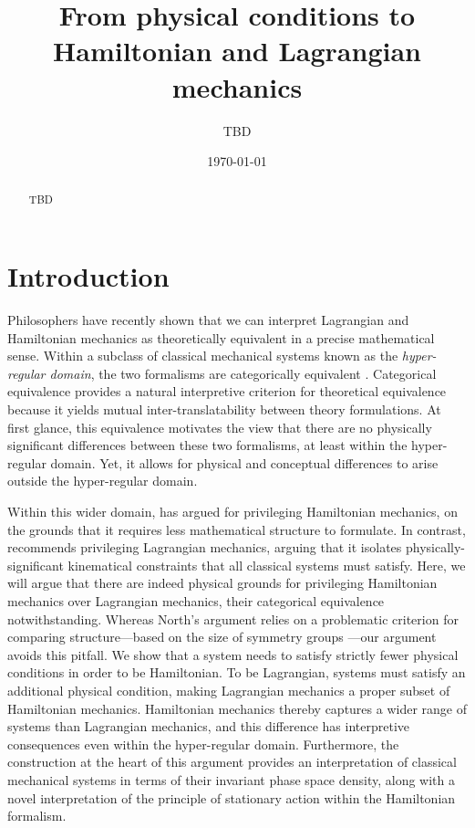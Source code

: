 \documentclass[letterpaper]{article}
\begin{document}
\title{From physical conditions to Hamiltonian and Lagrangian mechanics}
\author{TBD}

\date{\today}

\maketitle

\begin{abstract}
	TBD
\end{abstract}

\tableofcontents 


\section{Introduction}
\label{introduction}



Philosophers have recently shown that we can interpret Lagrangian and Hamiltonian mechanics as theoretically equivalent in a precise mathematical sense. Within a subclass of classical mechanical systems known as the \textit{hyper-regular domain}, the two formalisms are categorically equivalent \parencites[]{Teh}{Barrett2}. Categorical equivalence provides a natural interpretive criterion for theoretical equivalence because it yields mutual inter-translatability between theory formulations. At first glance, this equivalence motivates the view that there are no physically significant differences between these two formalisms, at least within the hyper-regular domain. Yet, it allows for physical and conceptual differences to arise outside the hyper-regular domain. 

Within this wider domain, \textcites[]{North} has argued for privileging Hamiltonian mechanics, on the grounds that it requires less mathematical structure to formulate. In contrast, \textcites[]{Curiel} recommends privileging Lagrangian mechanics, arguing that it isolates physically-significant kinematical constraints that all classical systems must satisfy. Here, we will argue that there are indeed physical grounds for privileging Hamiltonian mechanics over Lagrangian mechanics, their categorical equivalence notwithstanding. Whereas North's argument relies on a problematic criterion for comparing structure---based on the size of symmetry groups \parencites[]{Swanson}---our argument avoids this pitfall. We show that a system needs to satisfy strictly fewer physical conditions in order to be Hamiltonian. To be Lagrangian, systems must satisfy an additional physical condition, making Lagrangian mechanics a proper subset of Hamiltonian mechanics. Hamiltonian mechanics thereby captures a wider range of systems than Lagrangian mechanics, and this difference has interpretive consequences even within the hyper-regular domain. Furthermore, the construction at the heart of this argument provides an interpretation of classical mechanical systems in terms of their invariant phase space density, along with a novel interpretation of the principle of stationary action within the Hamiltonian formalism.
\end{document}
